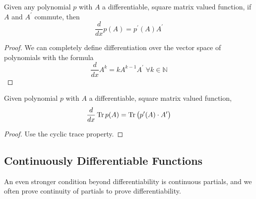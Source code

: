   \begin{corollary}
    Given any polynomial $p$ with $A$ a differentiable, square matrix valued function, if $A$ and $A^\prime$ commute, then 
    \begin{equation}
      \frac{d}{d x} p(A) = p^\prime (A) A^\prime
    \end{equation}
  \end{corollary}
  \begin{proof}
    We can completely define differentiation over the vector space of polynomials with the formula
    \begin{equation}
      \frac{d}{d x} A^k = k A^{k-1} A^\prime \; \forall k \in \mathbb{N}
    \end{equation}
  \end{proof}

  \begin{corollary}
    Given polynomial $p$ with $A$ a differentiable, square matrix valued function, 
    \begin{equation}
      \frac{d}{d x} \operatorname{Tr}{p(A)} = \operatorname{Tr}{\big( p^\prime(A) \cdot A^\prime \big)}
    \end{equation}
  \end{corollary}
  \begin{proof}
    Use the cyclic trace property.
  \end{proof}

\subsection{Continuously Differentiable Functions}

  An even stronger condition beyond differentiability is continuous partials, and we often prove continuity of partials to prove differentiability. 

